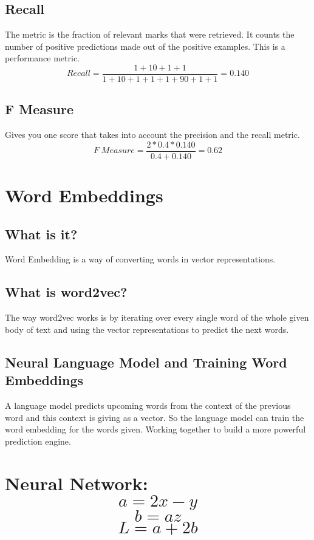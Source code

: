 \documentclass{article}
\begin{document}
\subsection{Recall}
The metric is the fraction of relevant marks that were retrieved. It counts the number of positive predictions made out of the positive examples.
This is a performance metric. 
\begin{equation}
	Recall=\frac{1+10+1+1}{1+10+1+1+ 1 + 90 + 1 +1}=0.140
\end{equation}
\subsection{F Measure}
Gives you one score that takes into account the precision and the recall metric.
\begin{equation}
	F\;Measure=\frac{2 * 0.4 * 0.140}{0.4 + 0.140}=0.62
\end{equation}
\section{Word Embeddings} 
\subsection{What is it?}
Word Embedding is a way of converting words in vector representations.
\subsection{What is word2vec?}
The way word2vec works is by iterating over every single word of the whole given body of text and using the vector representations to predict the next words.
\subsection{Neural Language Model and Training Word Embeddings}
A language model predicts upcoming words from the context of the previous word and this context is giving as a vector. 
So the language model can train the word embedding for the words given. Working together to build a more powerful prediction engine. 
\section{Neural Network: \[a = 2x - y\] \[b = az\] \[L = a + 2b\]
}
\end{document}
